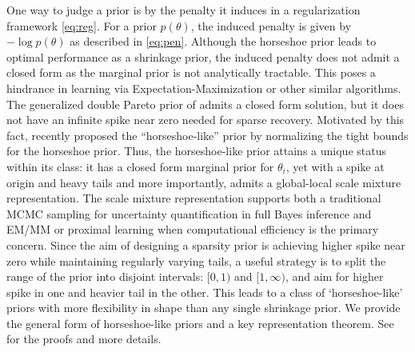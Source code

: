 \documentclass[11pt]{article}
\begin{document}
One way to judge a prior is by the penalty it induces in a regularization
framework \eqref{eq:reg}. For a prior $p(\theta)$, the induced penalty is given
by $-\log p(\theta)$ as described in \eqref{eq:pen}. Although the horseshoe
prior leads to optimal performance as a shrinkage prior, the induced penalty
does not admit a closed form as the marginal prior is not analytically
tractable. This poses a hindrance in learning via Expectation-Maximization or
other similar algorithms.  The generalized double Pareto prior of
\citet{armagan2011generalized} admits a closed form solution, but it does not
have an infinite spike near zero needed for sparse recovery. Motivated by this fact,
\citet{bhadra2017horseshoe} recently proposed the ``horseshoe-like'' prior by
normalizing the tight bounds for the horseshoe prior. Thus, the horseshoe-like
prior attains a unique status within its class: it has a closed form marginal
prior for $\theta_i$, yet with a spike at origin and heavy tails and more
importantly, admits a global-local scale mixture representation. The scale
mixture representation supports both a traditional MCMC sampling for uncertainty
quantification in full Bayes inference and EM/MM or proximal learning when
computational efficiency is the primary concern. Since the aim of designing a
sparsity prior is achieving higher spike near zero while maintaining regularly
varying tails, a useful strategy is to split the range of the prior into
disjoint intervals: $[0,1)$ and $[1, \infty)$, and aim for higher spike in one
and heavier tail in the other. This leads to a class of `horseshoe-like' priors
with more flexibility in shape than any single shrinkage prior. We provide the
general form of horseshoe-like priors and a key
representation theorem.  See \citet{bhadra2017horseshoe} for the proofs and more details. 
\end{document}

